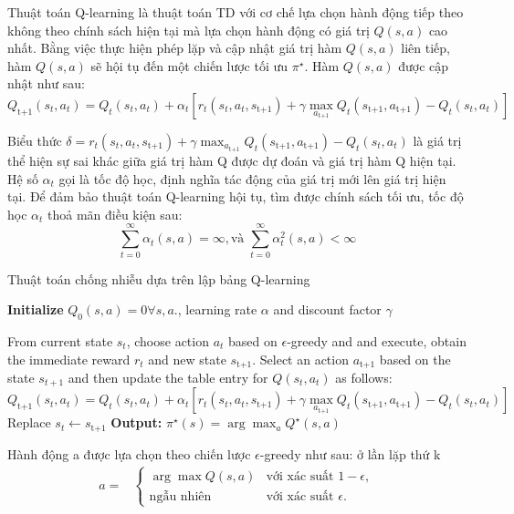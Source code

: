 \documentclass{uetgraduation}
\begin{document}
Thuật toán Q-learning là thuật toán TD với cơ chế lựa chọn hành động tiếp theo không theo chính sách hiện tại mà lựa chọn hành động có giá trị
$Q(s, a)$ cao nhất. Bằng việc thực hiện phép lặp và cập nhật giá trị hàm $Q(s, a)$ liên tiếp, hàm $Q(s, a)$ sẽ hội tụ đến một chiến lược tối ưu $\pi^\star$.
Hàm $Q(s, a)$ được cập nhật như sau:
\begin{equation}
    Q_\text{t+1} (s_t, a_t) = Q_t (s_t, a_t) + \alpha_t [r_t(s_t, a_t, s_\text{t+1}) + \gamma \max_{a_\text{t+1}} Q_t (s_\text{t+1}, a_\text{t+1}) - Q_t (s_t, a_t) ]
\end{equation}

Biểu thức $\delta = r_t(s_t, a_t, s_\text{t+1}) + \gamma \max_{a_\text{t+1}} Q_t (s_\text{t+1}, a_\text{t+1}) - Q_t (s_t, a_t)$ là giá trị thể hiện sự sai khác
giữa giá trị hàm Q được dự đoán và giá trị hàm Q hiện tại. Hệ số $\alpha_t$ gọi là tốc độ học, định nghĩa tác động của giá trị mới lên giá trị hiện tại. Để đảm bảo thuật toán
Q-learning hội tụ, tìm được chính sách tối ưu, tốc độ học $\alpha_t$ thoả mãn điều kiện sau:
\begin{equation}
    \sum_{t=0}^{\infty} \alpha_t (s, a) = \infty, \text{và } \sum_{t=0}^{\infty} \alpha_t^2 (s, a) < \infty
\end{equation}
\begin{algorithm}
    \caption{Thuật toán chống nhiễu dựa trên lập bảng Q-learning}\label{alg:qlearning}
    \begin{algorithmic}[1]
    \State \textbf{Initialize } $Q_0(s,a) = 0 \forall s,a.$, learning rate $\alpha$ and discount factor $\gamma$
    
        \State From current state $s_t$, choose action $a_t$ based on $\epsilon$-greedy and and execute, obtain the immediate reward
        $r_t$ and new state $s_\text{t+1}$. Select an action $a_\text{t+1}$ based on the state $s_{t+1}$ and then update the table entry for $Q(s_t, a_t)$
        as follows:
        \[
        Q_\text{t+1} (s_t, a_t) = Q_t (s_t, a_t) + \alpha_t [r_t(s_t, a_t, s_\text{t+1}) + \gamma \max_{a_\text{t+1}} Q_t (s_\text{t+1}, a_\text{t+1}) - Q_t (s_t, a_t) ]
        \]
        \State Replace $s_t \leftarrow s_\text{t+1}$
    \EndFor
    \State \textbf{Output: } $\pi^\star (s) = \arg \max_{a} Q^\star (s, a)$
\end{algorithmic}
\end{algorithm}

Hành động a được lựa chọn theo chiến lược $\epsilon$-greedy như sau: ở lần lặp thứ k
\begin{align*}
    a =& \begin{cases}
        \arg \max Q(s, a) & \text{với xác suất } 1 - \epsilon, \\ 
        \text{ngẫu nhiên} & \text{với xác suất } \epsilon.
    \end{cases}
\end{align*}
\end{document}
